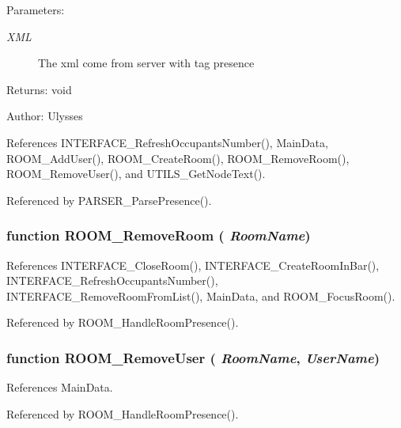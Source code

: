 \begin{Desc}
\item[Parameters:]
\begin{description}
\item[{\em XML}]The xml come from server with tag presence \end{description}
\end{Desc}
\begin{Desc}
\item[Returns:]void \end{Desc}
\begin{Desc}
\item[Author:]Ulysses \end{Desc}


References INTERFACE\_\-RefreshOccupantsNumber(), MainData, ROOM\_\-AddUser(), ROOM\_\-CreateRoom(), ROOM\_\-RemoveRoom(), ROOM\_\-RemoveUser(), and UTILS\_\-GetNodeText().

Referenced by PARSER\_\-ParsePresence().
\subsubsection{\setlength{\rightskip}{0pt plus 5cm}function ROOM\_\-RemoveRoom ( {\em RoomName})}\label{room_2room_8js_c30944b06d7d613f1f1d9a06f9004271}




References INTERFACE\_\-CloseRoom(), INTERFACE\_\-CreateRoomInBar(), INTERFACE\_\-RefreshOccupantsNumber(), INTERFACE\_\-RemoveRoomFromList(), MainData, and ROOM\_\-FocusRoom().

Referenced by ROOM\_\-HandleRoomPresence().
\subsubsection{\setlength{\rightskip}{0pt plus 5cm}function ROOM\_\-RemoveUser ( {\em RoomName}, \/   {\em UserName})}\label{room_2room_8js_3fe1367cac303f84c7205a72319fd60f}




References MainData.

Referenced by ROOM\_\-HandleRoomPresence().
